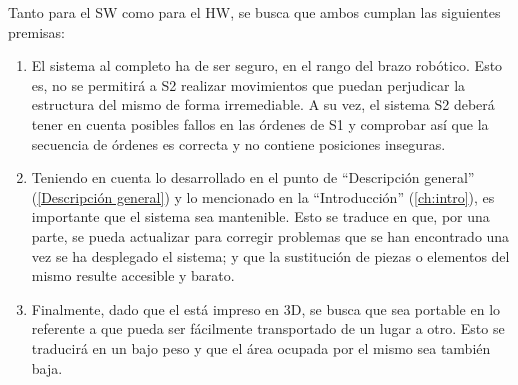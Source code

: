 Tanto para el \ac{SW} como para el \ac{HW}, se busca que ambos cumplan las siguientes premisas:

\begin{enumerate}
    \item El sistema al completo ha de ser seguro, en el rango del brazo robótico. Esto es, no se permitirá a \ac{S2} realizar movimientos que puedan perjudicar la estructura del mismo de forma irremediable. A su vez, el sistema \ac{S2} deberá tener en cuenta posibles fallos en las órdenes de \ac{S1} y comprobar así que la secuencia de órdenes es correcta y no contiene posiciones inseguras.
    \item Teniendo en cuenta lo desarrollado en el punto de ``Descripción general'' (\ref{Descripción general}) y lo mencionado en la ``Introducción'' (\ref{ch:intro}), es importante que el sistema sea mantenible. Esto se traduce en que, por una parte, se pueda actualizar para corregir problemas que se han encontrado una vez se ha desplegado el sistema; y que la sustitución de piezas o elementos del mismo resulte accesible y barato.
    \item Finalmente, dado que el \pArm{} está impreso en 3D, se busca que sea portable en lo referente a que pueda ser fácilmente transportado de un lugar a otro. Esto se traducirá en un bajo peso y que el área ocupada por el mismo sea también baja.
\end{enumerate}
